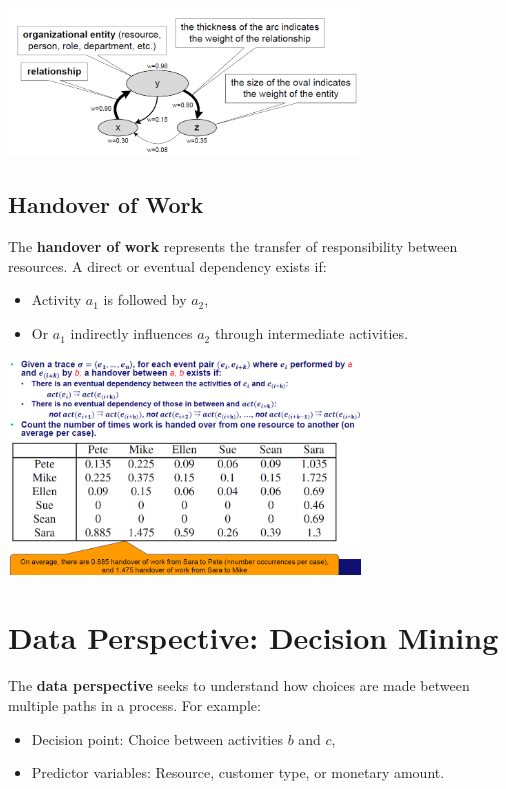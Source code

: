 \begin{center}
    \includegraphics[width=0.7\textwidth]{capitolo 8/slide24.png}
\end{center}

\subsection{Handover of Work}
The \textbf{handover of work} represents the transfer of responsibility between resources. A direct or eventual dependency exists if:
\begin{itemize}
    \item Activity \(a_1\) is followed by \(a_2\),
    \item Or \(a_1\) indirectly influences \(a_2\) through intermediate activities.
\end{itemize}
\begin{center}
    \includegraphics[width=0.7\textwidth]{capitolo 8/slide26.png}
\end{center}

\section{Data Perspective: Decision Mining}

The \textbf{data perspective} seeks to understand how choices are made between multiple paths in a process. For example:
\begin{itemize}
    \item Decision point: Choice between activities \(b\) and \(c\),
    \item Predictor variables: Resource, customer type, or monetary amount.
\end{itemize}

